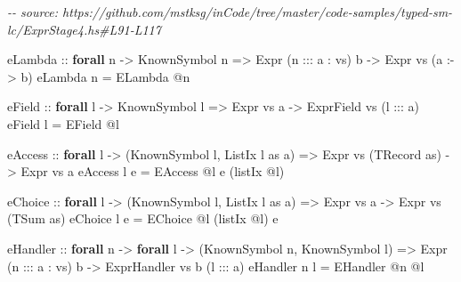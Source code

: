 \documentclass[]{article}
\newenvironment{Shaded}{}{}
\newcommand{\CommentTok}[1]{\textcolor[rgb]{0.38,0.63,0.69}{\textit{#1}}}
\newcommand{\DataTypeTok}[1]{\textcolor[rgb]{0.56,0.13,0.00}{#1}}
\newcommand{\KeywordTok}[1]{\textcolor[rgb]{0.00,0.44,0.13}{\textbf{#1}}}
\newcommand{\NormalTok}[1]{#1}
\newcommand{\OperatorTok}[1]{\textcolor[rgb]{0.40,0.40,0.40}{#1}}
\newcommand{\OtherTok}[1]{\textcolor[rgb]{0.00,0.44,0.13}{#1}}
\begin{document}
\begin{Shaded}
\begin{Highlighting}[]
\CommentTok{{-}{-} source: https://github.com/mstksg/inCode/tree/master/code{-}samples/typed{-}sm{-}lc/ExprStage4.hs\#L91{-}L117}

\OtherTok{eLambda ::} \KeywordTok{forall}\NormalTok{ n }\OtherTok{{-}\textgreater{}} \DataTypeTok{KnownSymbol}\NormalTok{ n }\OtherTok{=\textgreater{}} \DataTypeTok{Expr}\NormalTok{ (n }\OperatorTok{:::}\NormalTok{ a \textquotesingle{}}\OperatorTok{:}\NormalTok{ vs) b }\OtherTok{{-}\textgreater{}} \DataTypeTok{Expr}\NormalTok{ vs (a }\OperatorTok{:{-}\textgreater{}}\NormalTok{ b)}
\NormalTok{eLambda n }\OtherTok{=} \DataTypeTok{ELambda} \OperatorTok{@}\NormalTok{n}

\OtherTok{eField ::} \KeywordTok{forall}\NormalTok{ l }\OtherTok{{-}\textgreater{}} \DataTypeTok{KnownSymbol}\NormalTok{ l }\OtherTok{=\textgreater{}} \DataTypeTok{Expr}\NormalTok{ vs a }\OtherTok{{-}\textgreater{}} \DataTypeTok{ExprField}\NormalTok{ vs (l }\OperatorTok{:::}\NormalTok{ a)}
\NormalTok{eField l }\OtherTok{=} \DataTypeTok{EField} \OperatorTok{@}\NormalTok{l}

\OtherTok{eAccess ::}
  \KeywordTok{forall}\NormalTok{ l }\OtherTok{{-}\textgreater{}}
\NormalTok{  (}\DataTypeTok{KnownSymbol}\NormalTok{ l, }\DataTypeTok{ListIx}\NormalTok{ l as a) }\OtherTok{=\textgreater{}}
  \DataTypeTok{Expr}\NormalTok{ vs (}\DataTypeTok{TRecord}\NormalTok{ as) }\OtherTok{{-}\textgreater{}}
  \DataTypeTok{Expr}\NormalTok{ vs a}
\NormalTok{eAccess l e }\OtherTok{=} \DataTypeTok{EAccess} \OperatorTok{@}\NormalTok{l e (listIx }\OperatorTok{@}\NormalTok{l)}

\OtherTok{eChoice ::}
  \KeywordTok{forall}\NormalTok{ l }\OtherTok{{-}\textgreater{}}
\NormalTok{  (}\DataTypeTok{KnownSymbol}\NormalTok{ l, }\DataTypeTok{ListIx}\NormalTok{ l as a) }\OtherTok{=\textgreater{}}
  \DataTypeTok{Expr}\NormalTok{ vs a }\OtherTok{{-}\textgreater{}}
  \DataTypeTok{Expr}\NormalTok{ vs (}\DataTypeTok{TSum}\NormalTok{ as)}
\NormalTok{eChoice l e }\OtherTok{=} \DataTypeTok{EChoice} \OperatorTok{@}\NormalTok{l (listIx }\OperatorTok{@}\NormalTok{l) e}

\OtherTok{eHandler ::}
  \KeywordTok{forall}\NormalTok{ n }\OtherTok{{-}\textgreater{}}
  \KeywordTok{forall}\NormalTok{ l }\OtherTok{{-}\textgreater{}}
\NormalTok{  (}\DataTypeTok{KnownSymbol}\NormalTok{ n, }\DataTypeTok{KnownSymbol}\NormalTok{ l) }\OtherTok{=\textgreater{}}
  \DataTypeTok{Expr}\NormalTok{ (n }\OperatorTok{:::}\NormalTok{ a \textquotesingle{}}\OperatorTok{:}\NormalTok{ vs) b }\OtherTok{{-}\textgreater{}}
  \DataTypeTok{ExprHandler}\NormalTok{ vs b (l }\OperatorTok{:::}\NormalTok{ a)}
\NormalTok{eHandler n l }\OtherTok{=} \DataTypeTok{EHandler} \OperatorTok{@}\NormalTok{n }\OperatorTok{@}\NormalTok{l}
\end{Highlighting}
\end{Shaded}
\end{document}
